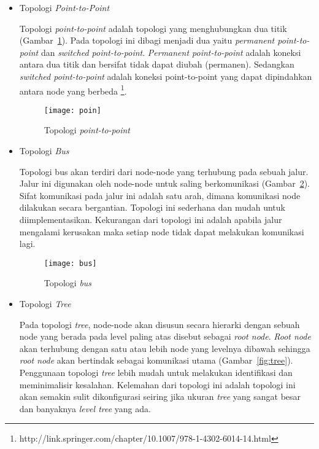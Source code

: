 \begin{itemize}
	\item Topologi \textit{Point-to-Point}
	
	Topologi \textit{point-to-point} adalah topologi yang menghubungkan dua titik (Gambar~\ref{fig:poin}). Pada topologi ini dibagi menjadi dua yaitu \textit{permanent point-to-point} dan \textit{switched point-to-point}. \textit{Permanent point-to-point} adalah koneksi antara dua titik dan bersifat tidak dapat diubah (permanen). Sedangkan \textit{switched point-to-point} adalah koneksi point-to-point yang dapat dipindahkan antara node yang berbeda \footnote{http://link.springer.com/chapter/10.1007/978-1-4302-6014-14.html}.
	
	\begin{figure}[H] 
		\centering  
		\texttt{[image: poin]}  
		\caption[Topologi \textit{point-to-point}]{Topologi \textit{point-to-point}}
		\label{fig:poin} 
	\end{figure}

	\item Topologi \textit{Bus}
	
	Topologi bus akan terdiri dari node-node yang terhubung pada sebuah jalur. Jalur ini digunakan oleh node-node untuk saling berkomunikasi (Gambar~\ref{fig:bus}). Sifat komunikasi pada jalur ini adalah satu arah, dimana komunikasi node dilakukan secara bergantian. Topologi ini sederhana dan mudah untuk diimplementasikan. Kekurangan dari topologi ini adalah apabila jalur mengalami kerusakan maka setiap node tidak dapat melakukan komunikasi lagi.
	
	\begin{figure}[H] 
		\centering  
		\texttt{[image: bus]}  
		\caption[Topologi \textit{bus}]{Topologi \textit{bus}}
		\label{fig:bus} 
	\end{figure}
	
	\item Topologi \textit{Tree}
	
	Pada topologi \textit{tree}, node-node akan disusun secara hierarki dengan sebuah node yang berada pada level paling atas disebut sebagai \textit{root node}.  \textit{Root node} akan terhubung dengan satu atau lebih node yang levelnya dibawah sehingga \textit{root node} akan bertindak sebagai komunikasi utama (Gambar~\ref{fig:tree}). Penggunaan topologi \textit{tree} lebih mudah untuk melakukan identifikasi dan meminimalisir kesalahan. Kelemahan dari topologi ini adalah topologi ini akan semakin sulit dikonfigurasi seiring jika ukuran \textit{tree} yang sangat besar dan banyaknya \textit{level tree} yang ada.
	

\end{itemize}
